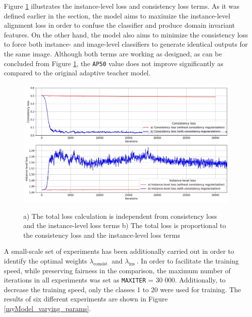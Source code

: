 Figure \ref{myModel_constloss_total} illustrates the instance-level loss and consistency loss terms. As it was defined earlier in the  section, the model aims to maximize the instance-level alignment loss in order to confuse the classifier and produce domain invariant features. On the other hand, the model also aims to minimize the consistency loss to force both instance- and image-level classifiers to generate identical outputs for the same image. Although both terms are working as designed, as can be concluded from Figure \ref{myModel_constloss_total}, the \texttt{AP50} value does not improve significantly as compared to the original adaptive teacher model. 

\begin{figure}[htb]
	\begin{center}
		\includegraphics[width=14cm]{./consistency_loss.jpg}
	\end{center}
	\caption{a) The total loss calculation is independent from consistency loss and the instance-level loss terms b) The total loss is proportional to the consistency loss and the instance-level loss terms}
	\begin{center}
		\label{myModel_constloss_total}
	\end{center}
\end{figure}
\FloatBarrier  

A small-scale set of experiments has been additionally carried out in order to identify the optimal weights $\lambda_{\text {consist }}$ and $\lambda_{\text {ins }}$. In order to facilitate the training speed, while preserving fairness in the  comparison, the maximum number of iterations in all experiments was set as \texttt{MAX\textunderscore ITER} = 30 000. Additionally, to decrease the training speed, only the classes 1 to 20 were used for training. The results of six different experiments are shown in Figure \ref{myModel_varying_params}.

